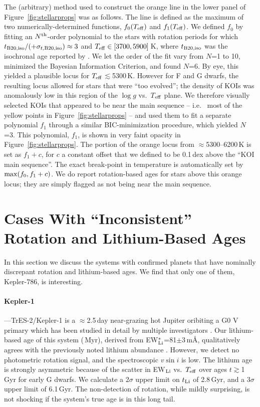 \documentclass[11pt,twocolumn,tighten]{aastex63}
\begin{document}
The (arbitrary) method used to construct the orange line in 
the lower panel of Figure~\ref{fig:stellarprops} was as follows.
The line is	defined as
the maximum of two numerically-determined functions, $f_0(T_{\rm eff})$ and $f_1(T_{\rm eff})$.
We defined $f_0$ by fitting an
$N^{\rm th}$-order polynomial to the stars with rotation periods for which $t_{\rm
	B20,iso}/(+\sigma_{t,{\rm B20,iso}})\approx 3$
and $T_{\rm eff}\in[3700,5900]$\,K, where
$t_{\rm B20,iso}$ was the isochronal age reported by
\citet{Berger_2020a_catalog}.  We let the order of the fit vary from
$N$=1 to 10, minimized the Bayesian Information Criterion,
and found $N$=6.  
By eye, this yielded a plausible locus for $T_{\rm eff}$$\lesssim$5300\,K.
However for F and G dwarfs, the resulting locus
allowed for stars that were ``too evolved''; the density of KOIs 
was anomalously low in this region of the $\log g$ vs.\ $T$$_{\rm eff}$ plane.
We therefore visually selected KOIs that appeared
to be near the main sequence -- i.e.~ most of the yellow
points in Figure~\ref{fig:stellarprops} -- and used them to fit a separate
polynomial $f_1$ through a similar BIC-minimization procedure,
which yielded $N$=3.
This polynomial, $f_1$, is shown in very faint opacity in Figure~\ref{fig:stellarprops}.
The portion of the orange locus from $\approx$5300--6200\,K
is set as $f_1 + c$, for $c$ a constant offset that we defined to be
0.1\,dex above the ``KOI main sequence''.
The exact break-point in temperature is automatically set by ${\rm max}(f_0, f_1+c)$.
We do report rotation-based ages for stars
above this orange locus;
they are simply flagged as not being near the main sequence. 

\section{Cases With ``Inconsistent'' Rotation and Lithium-Based Ages}
\label{app:inconsistent}

In this section we discuss the systems with confirmed planets that
have nominally discrepant rotation and lithium-based ages.  We find
that only one of them, Kepler-786, is interesting.

\paragraph{Kepler-1}---TrES-2/Kepler-1 \citep{2006ApJ...651L..61O} is
a $\approx$2.5\,day near-grazing hot Jupiter oribiting a G0 V primary
which has been studied in detail by multiple investigators
\citep[e.g.][]{2007ApJ...664.1190S,2008ApJ...682.1283W,2011ApJ...733...36K,2011MNRAS.417.2166S}.
Our lithium-based age of this system (\trestwotli\,Myr), derived from
EW$_{\rm Li}^{\ast}$=81$\pm$3\,m\AA, qualitatively agrees with the
previously noted lithium abundance \citep{2007ApJ...664.1190S}.
However, we detect no photometric rotation signal, and the
spectroscopic $v\sin i$ is low.  The lithium age is strongly
asymmetric because of the scatter in EW$_{\rm Li}$ vs.~$T_{\rm eff}$
over ages $t$$\gtrsim$1\,Gyr for early G dwarfs.  We calculate a
$2\sigma$ upper limit on $t_{\rm Li}$ of 2.8\,Gyr, and a $3\sigma$
upper limit of 6.1\,Gyr.  The non-detection of rotation, while mildly
surprising, is not shocking if the system's true age is in this long
tail.
\end{document}
